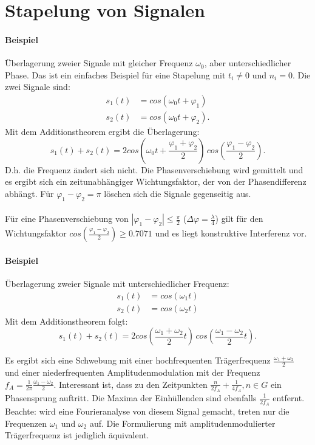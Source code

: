 \chapter{Stapelung von Signalen}

\subsubsection*{Beispiel} Überlagerung zweier Signale mit gleicher Frequenz $\omega_0$, aber unterschiedlicher Phase.  Das ist ein einfaches Beispiel für eine Stapelung mit $t_i\not= 0$ und $n_i=0$. Die zwei Signale sind:
\begin{align*}
s_1(t) & =cos(\omega_0 t+\varphi_1)\\
s_2(t) & =cos(\omega_0 t+\varphi_2).
\end{align*}
Mit dem Additionstheorem ergibt die Überlagerung:
\begin{equation}
s_1(t)+s_2(t)=2cos\left(\omega_0 t + \frac {\varphi_1 + \varphi_2}{2}\right)\,cos\left(\frac {\varphi_1 - \varphi_2}{2}\right).
\end{equation}
D.h. die Frequenz ändert sich nicht. Die Phasenverschiebung wird gemittelt und es ergibt sich ein zeitunabhängiger Wichtungsfaktor, der von der Phasendifferenz abhängt. Für $\varphi_1-\varphi_2= \pi $ löschen sich die Signale gegenseitig aus.\\\\
Für eine Phasenverschiebung von $|\varphi_1-\varphi_2|\le \frac{\pi}{2}$ ($\Delta\varphi = \frac{\lambda}{4}$) gilt für den Wichtungsfaktor $cos(\frac{\varphi_1-\varphi_2}{2})\ge 0.7071$ und es liegt konstruktive Interferenz vor.\\ 

\subsubsection*{Beispiel}
Überlagerung zweier Signale mit unterschiedlicher Frequenz:
\begin{align*}
s_1(t) & =cos(\omega_1 t)\\
s_2(t) &=cos(\omega_2 t)
\end{align*}
Mit dem Additionstheorem folgt:
\begin{equation}
s_1(t)+s_2(t)= 2 cos\left(\frac{\omega_1+\omega_2}{2}t\right)\,cos\left(\frac{\omega_1-\omega_2}{2}t\right).
\end{equation}

Es ergibt sich eine Schwebung mit einer hochfrequenten Trägerfrequenz $\frac{\omega_1+\omega_2}{2}$ und einer niederfrequenten Amplitudenmodulation mit der Frequenz $f_A = \frac{1}{2\pi}\frac{\omega_1-\omega_2}{2}$. Interessant ist, dass zu den Zeitpunkten $\frac{n}{2f_A}+\frac{1}{4f_A}, n \in G$ ein Phasensprung auftritt. Die Maxima der Einhüllenden sind ebenfalls $\frac{1}{2f_A}$ entfernt. Beachte: wird eine Fourieranalyse von diesem Signal gemacht, treten nur die Frequenzen $\omega_1$ und $\omega_2$ auf. Die Formulierung mit amplitudenmodulierter Trägerfrequenz ist jediglich äquivalent.\\ 

